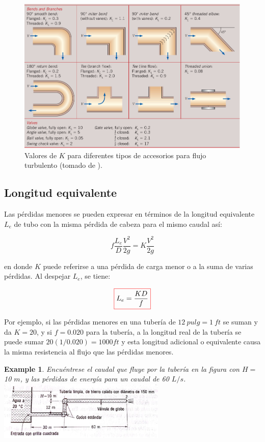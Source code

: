 \documentclass[11pt, oneside]{article}
\newtheorem{exa}{Example}
\begin{document}
\begin{figure}[h]
\centering
\includegraphics[width=\textwidth]{acce4.png}
\caption{Valores de $K$ para diferentes tipos de accesorios para flujo turbulento (tomado de \cite{cengel2013ebook}).}
\label{acce4}
\end{figure}

\subsection{Longitud equivalente} %
Las p\'erdidas menores se pueden expresar en t\'erminos de la longitud equivalente $L_e$ de tubo con la misma p\'erdida de cabeza para el mismo caudal as\'i:

\begin{equation}
f \frac{L_e }{D} \frac{V^2}{2g} = K \frac{V^2}{2g}
\label{perm11}
\end{equation}

en donde $K$ puede referirse a una p\'erdida de carga menor o a la suma de varias p\'erdidas. Al despejar $L_e$, se tiene:

\begin{equation}
\color{red}\boxed{\color{black} L_e = \frac{KD}{f} }
\label{perm12}
\end{equation}

Por ejemplo, si las p\'erdidas menores en una tuber\'ia de $12\ pulg = 1\ ft$ se suman y da $K=20$, y si $f = 0.020$ para la tuber\'ia, a la longitud real de la tuber\'ia se puede sumar $20(1/0.020)=1000 ft$ y esta longitud adicional o equivalente causa la misma resistencia al flujo que las p\'erdidas menores. 

\begin{shaded}
\begin{exa}
Encu\'entrese el caudal que fluye por la tuber\'ia en la figura con $H =$ 10 $m$, y las p\'erdidas de energ\'ia para un caudal de 60 $L/s$.
\includegraphics[width=8cm]{exa20.jpeg}
\end{exa}
\end{shaded}
\end{document}
